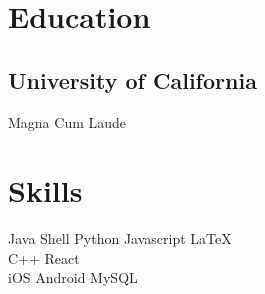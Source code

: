 \documentclass[]{devanshu-resume-openfont}
\begin{document}
\begin{minipage}[t]{0.33\textwidth}


\section{Education}

\subsection{University of California}
Magna Cum Laude\\

\sectionsep


\section{Skills}

Java \textbullet{}   Shell \textbullet{} Python \textbullet{} Javascript
\textbullet \LaTeX\ \\
C++ \textbullet{} React \textbullet{} \\

iOS \textbullet{} Android \textbullet{} MySQL
\sectionsep







\end{minipage}
\end{document}
